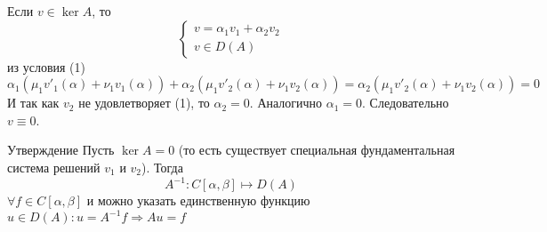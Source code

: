 \documentclass[14pt]{extarticle}
\begin{document}
\begin{Proof}
    Если $v \in \ker A$, то 
    $$
    \left\{
    \begin{array}{l}
        v = \alpha_1 v_1 + \alpha_2 v_2\\
        v \in D(A)
    \end{array}
    \right.
    $$
    из условия (1)
    $$
    \alpha_1(\mu_1 v'_1(\alpha) + \nu_1 v_1(\alpha)) + \alpha_2(\mu_1 v'_2(\alpha) + \nu_1 
    v_2(\alpha)) = \alpha_2(\mu_1 v'_2(\alpha) + \nu_1 v_2(\alpha)) = 0
    $$
    И так как $v_2$ не удовлетворяет (1), то $\alpha_2 = 0$.
    Аналогично $\alpha_1 = 0$.
    Следовательно $v \equiv 0$.
\end{Proof}
\begin{MathCl}{Утверждение}
    Пусть $\ker A = 0$ (то есть существует специальная фундаментальная система решений 
    $v_1$ и $v_2$). 
    Тогда
    $$
    A^{-1} : C[\alpha, \beta] \mapsto D(A)
    $$
    $\forall f \in C[\alpha, \beta]$ и можно указать единственную функцию $u \in D(A)
    \colon u = A^{-1}f \Rightarrow Au = f$
\end{MathCl}
\end{document}
